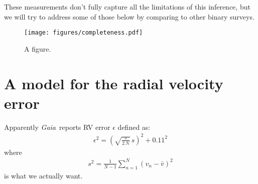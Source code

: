\documentclass[modern, letterpaper]{aastex631}
\newcommand{\project}[1]{\textsl{#1}}
\newcommand{\Gaia}{\project{Gaia}}
\begin{document}
These measurements don't fully capture all the limitations of this inference, but we will try to address some of those below by comparing to other binary surveys.


\begin{figure}
	\begin{centering}
		\texttt{[image: figures/completeness.pdf]}
		\caption{A figure.}
		\label{fig:completeness}
	\end{centering}
\end{figure}



\section{A model for the radial velocity error}

Apparently \Gaia\ reports RV error $\epsilon$ defined as:
\begin{eqnarray}
	\epsilon^2 = \left(\sqrt{\frac{\pi}{2\,N}}\,s\right)^2 + 0.11^2
\end{eqnarray}
where
\begin{eqnarray}
	s^2 = \frac{1}{N-1}\sum_{n=1}^N \left(v_n - \bar{v}\right)^2
\end{eqnarray}
is what we actually want.
\end{document}
